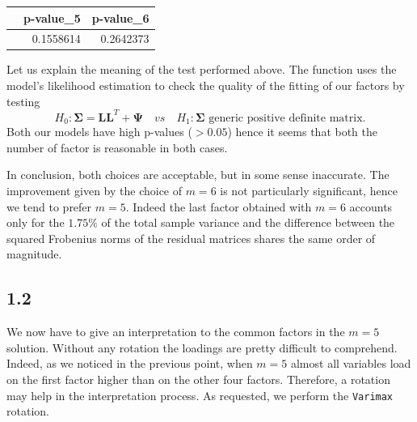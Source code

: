 \documentclass[
]{article}
\newenvironment{Shaded}{\begin{snugshade}}{\end{snugshade}}
\newcommand{\AttributeTok}[1]{\textcolor[rgb]{0.13,0.29,0.53}{#1}}
\newcommand{\DecValTok}[1]{\textcolor[rgb]{0.00,0.00,0.81}{#1}}
\newcommand{\FunctionTok}[1]{\textcolor[rgb]{0.13,0.29,0.53}{\textbf{#1}}}
\newcommand{\NormalTok}[1]{#1}
\newcommand{\OtherTok}[1]{\textcolor[rgb]{0.56,0.35,0.01}{#1}}
\newcommand{\SpecialCharTok}[1]{\textcolor[rgb]{0.81,0.36,0.00}{\textbf{#1}}}
\newcommand{\StringTok}[1]{\textcolor[rgb]{0.31,0.60,0.02}{#1}}
\theoremstyle{plain}
\begin{document}
\begin{longtable}[]{@{}lrr@{}}
\toprule\noalign{}
& p-value\_5 & p-value\_6 \\
\midrule\noalign{}
\endhead
\bottomrule\noalign{}
\endlastfoot
& 0.1558614 & 0.2642373 \\
\end{longtable}

Let us explain the meaning of the test performed above. \newline The
function uses the model's likelihood estimation to check the quality of
the fitting of our factors by testing \[
    H_0: \boldsymbol{\Sigma} = \boldsymbol{L} \boldsymbol{L}^T + \boldsymbol{\Psi} \quad vs \quad H_1 : \boldsymbol{\Sigma} \text{ generic positive definite matrix.}
\] Both our models have high p-values (\(> 0.05\)) hence it seems that
both the number of factor is reasonable in both cases.

In conclusion, both choices are acceptable, but in some sense
inaccurate. The improvement given by the choice of \(m = 6\) is not
particularly significant, hence we tend to prefer \(m = 5\). Indeed the
last factor obtained with \(m = 6\) accounts only for the \(1.75\%\) of
the total sample variance and the difference between the squared
Frobenius norms of the residual matrices shares the same order of
magnitude.

\hypertarget{section-1}{%
\subsection{1.2}\label{section-1}}

We now have to give an interpretation to the common factors in the
\(m = 5\) solution. Without any rotation the loadings are pretty
difficult to comprehend. Indeed, as we noticed in the previous point,
when \(m = 5\) almost all variables load on the first factor higher than
on the other four factors. Therefore, a rotation may help in the
interpretation process. As requested, we perform the \texttt{Varimax}
rotation.

\smallskip

\begin{Shaded}
\end{Shaded}
\end{document}
